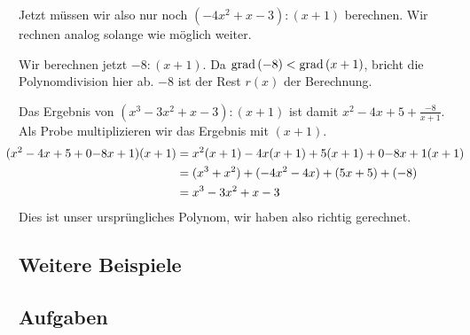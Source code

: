 			
			Jetzt müssen wir also nur noch $(-4x^2+x-3):(x+1)$ berechnen. Wir rechnen
			analog solange wie möglich weiter.
			
			
			Wir berechnen jetzt $-8:(x+1)$. Da $\text{grad}\,(-8) < \text{grad}\,(x+1)$, bricht die
			Polynomdivision hier ab. $-8$ ist der \glqq Rest\grqq{} $r(x)$ der Berechnung.
			
			
			Das Ergebnis von $(x^3-3x^2+x-3):(x+1)$ ist damit $x^2-4x+5+\frac{-8}{x+1}$.
			Als Probe multiplizieren wir das Ergebnis mit $(x+1)$.
			\begin{align*}\hspace{-11pt}
				(x^2-4x+5+\frac{-8}{x+1})(x+1) 
				&= x^2(x+1)-4x(x+1)+5(x+1)+\frac{-8}{x+1}(x+1)\\
				&= (x^3 + x^2) + (-4x^2 -4x) + (5x +5) + (-8)\\
				&= x^3 -3x^2 +x -3
			\end{align*}
			Dies ist unser ursprüngliches Polynom, wir haben also richtig gerechnet.
		
	\subsection{Weitere Beispiele}
	
		
		
	\subsection{Aufgaben}
	
